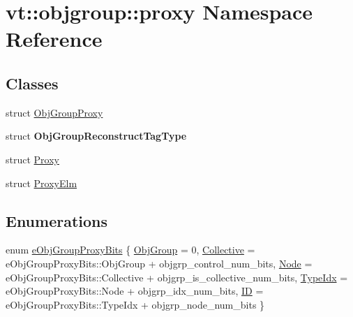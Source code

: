 \hypertarget{namespacevt_1_1objgroup_1_1proxy}{}\section{vt\+:\+:objgroup\+:\+:proxy Namespace Reference}
\label{namespacevt_1_1objgroup_1_1proxy}
\subsection*{Classes}
\begin{DoxyCompactItemize}
\item 
struct \hyperlink{structvt_1_1objgroup_1_1proxy_1_1_obj_group_proxy}{Obj\+Group\+Proxy}
\item 
struct {\bfseries Obj\+Group\+Reconstruct\+Tag\+Type}
\item 
struct \hyperlink{structvt_1_1objgroup_1_1proxy_1_1_proxy}{Proxy}
\item 
struct \hyperlink{structvt_1_1objgroup_1_1proxy_1_1_proxy_elm}{Proxy\+Elm}
\end{DoxyCompactItemize}
\subsection*{Enumerations}
\begin{DoxyCompactItemize}
\item 
enum \hyperlink{namespacevt_1_1objgroup_1_1proxy_a5cfde1a666e49070fcc0312e51d53777}{e\+Obj\+Group\+Proxy\+Bits} \{ \newline
\hyperlink{namespacevt_1_1objgroup_1_1proxy_a5cfde1a666e49070fcc0312e51d53777a235be9f56eb1337ea20d2937ffb7a8a4}{Obj\+Group} = 0, 
\hyperlink{namespacevt_1_1objgroup_1_1proxy_a5cfde1a666e49070fcc0312e51d53777ab1d0e2d0ac577126529814c35a32c003}{Collective} = e\+Obj\+Group\+Proxy\+Bits\+:\+:Obj\+Group + objgrp\+\_\+control\+\_\+num\+\_\+bits, 
\hyperlink{namespacevt_1_1objgroup_1_1proxy_a5cfde1a666e49070fcc0312e51d53777a179829552544d5bb4b3bac56d953e06a}{Node} = e\+Obj\+Group\+Proxy\+Bits\+:\+:Collective + objgrp\+\_\+is\+\_\+collective\+\_\+num\+\_\+bits, 
\hyperlink{namespacevt_1_1objgroup_1_1proxy_a5cfde1a666e49070fcc0312e51d53777a3993e012fc4525e4ddc1a6e30a75714c}{Type\+Idx} = e\+Obj\+Group\+Proxy\+Bits\+:\+:Node + objgrp\+\_\+idx\+\_\+num\+\_\+bits, 
\newline
\hyperlink{namespacevt_1_1objgroup_1_1proxy_a5cfde1a666e49070fcc0312e51d53777a6de04ce539708519a851efd1640f2b48}{ID} = e\+Obj\+Group\+Proxy\+Bits\+:\+:Type\+Idx + objgrp\+\_\+node\+\_\+num\+\_\+bits
 \}
\end{DoxyCompactItemize}


